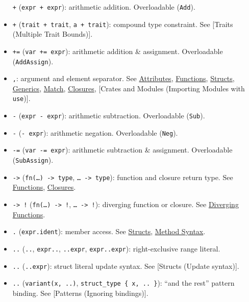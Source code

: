 \documentclass[a4paper,]{book}
\begin{document}
\begin{itemize}
  \texttt{+} (\texttt{expr\ +\ expr}): arithmetic addition. Overloadable
  (\texttt{Add}).
\item
  \texttt{+} (\texttt{trait\ +\ trait},
  \texttt{\textquotesingle{}a\ +\ trait}): compound type constraint. See
  {[}Traits (Multiple Trait Bounds){]}.
\item
  \texttt{+=} (\texttt{var\ +=\ expr}): arithmetic addition \&
  assignment. Overloadable (\texttt{AddAssign}).
\item
  \texttt{,}: argument and element separator. See
  \protect\hyperlink{sec--attributes}{Attributes},
  \protect\hyperlink{functions}{Functions},
  \protect\hyperlink{sec--structs}{Structs},
  \protect\hyperlink{sec--generics}{Generics},
  \protect\hyperlink{sec--match}{Match},
  \protect\hyperlink{sec--closures}{Closures}, {[}Crates and Modules
  (Importing Modules with \texttt{use}){]}.
\item
  \texttt{-} (\texttt{expr\ -\ expr}): arithmetic subtraction.
  Overloadable (\texttt{Sub}).
\item
  \texttt{-} (\texttt{-\ expr}): arithmetic negation. Overloadable
  (\texttt{Neg}).
\item
  \texttt{-=} (\texttt{var\ -=\ expr}): arithmetic subtraction \&
  assignment. Overloadable (\texttt{SubAssign}).
\item
  \texttt{-\textgreater{}}
  (\texttt{fn(\ldots{})\ -\textgreater{}\ type},
  \texttt{\textbar{}\ldots{}\textbar{}\ -\textgreater{}\ type}):
  function and closure return type. See
  \protect\hyperlink{functions}{Functions},
  \protect\hyperlink{sec--closures}{Closures}.
\item
  \texttt{-\textgreater{}\ !}
  (\texttt{fn(\ldots{})\ -\textgreater{}\ !},
  \texttt{\textbar{}\ldots{}\textbar{}\ -\textgreater{}\ !}): diverging
  function or closure. See
  \protect\hyperlink{diverging-functions}{Diverging Functions}.
\item
  \texttt{.} (\texttt{expr.ident}): member access. See
  \protect\hyperlink{sec--structs}{Structs},
  \protect\hyperlink{sec--method-syntax}{Method Syntax}.
\item
  \texttt{..} (\texttt{..}, \texttt{expr..}, \texttt{..expr},
  \texttt{expr..expr}): right-exclusive range literal.
\item
  \texttt{..} (\texttt{..expr}): struct literal update syntax. See
  {[}Structs (Update syntax){]}.
\item
  \texttt{..} (\texttt{variant(x,\ ..)},
  \texttt{struct\_type\ \{\ x,\ ..\ \}}): ``and the rest'' pattern
  binding. See {[}Patterns (Ignoring bindings){]}.

\end{itemize}
\end{document}
